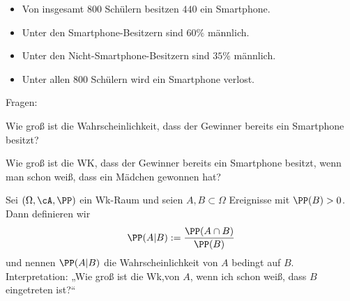 \begin{itemize}
\item Von insgesamt $800$ Schülern besitzen $440$ ein Smartphone.
\item Unter den Smartphone-Besitzern sind $60\%$ männlich.
\item Unter den Nicht-Smartphone-Besitzern sind $35\%$ männlich.
\item Unter allen $800$ Schülern wird ein Smartphone verlost.
\end{itemize}
Fragen:
\begin{anumerate}
\item Wie groß ist die Wahrscheinlichkeit, dass der Gewinner bereits ein Smartphone besitzt?
\item Wie groß ist die WK, dass der Gewinner bereits ein Smartphone besitzt, wenn man schon weiß, dass ein Mädchen gewonnen hat?
\end{anumerate}

 Sei $(\Omega, \cA, \PP)$ ein Wk-Raum und seien $A, B \subset \Omega$ Ereignisse mit $\PP(B)>0$. Dann definieren wir $$\PP(A|B):=\frac{\PP(A \cap B)}{\PP(B)}$$ und nennen $\PP (A|B)$ die Wahrscheinlichkeit von $A$ bedingt auf $B$.\\
Interpretation: „Wie groß ist die Wk,von $A$, wenn ich schon weiß, dass $B$ eingetreten ist?“

